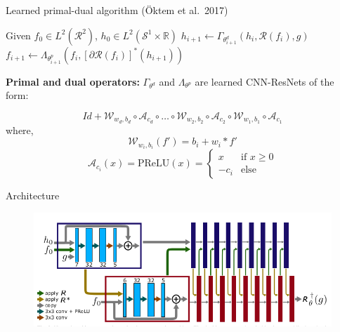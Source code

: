 \begin{frame}{Learned primal-dual algorithm (\"Oktem et al.\, 2017)}
\begin{algorithm}[H]
\begin{algorithmic}[1]
\STATE Given $f_0\in L^2(\mathcal{R}^2)$, $h_0\in L^2(\mathcal{S}^1\times \mathbb{R})$
\STATE $h_{i+1}\longleftarrow \Gamma_{\theta_{i+1}^d} (h_i,\mathcal{R}(f_i),g)$
\STATE $f_{i+1}\longleftarrow \Lambda_{\theta_{i+1}^p} (f_i,[\partial\mathcal{R}(f_i)]^*(h_{i+1}))$
\ENDFOR
\end{algorithmic}
\caption{Learned primal-dual algorithm}
\label{alg:seq}
\end{algorithm}

\pause

\textbf{Primal and dual operators:} $\Gamma_{\theta^d}$ and $\Lambda_{\theta^p}$ are learned CNN-ResNets of the form:

$$
Id+\mathcal{W}_{w_d,b_d}\circ \mathcal{A}_{c_d}\circ\ldots\circ\mathcal{W}_{w_2,b_2}\circ\mathcal{A}_{c_2}\circ\mathcal{W}_{w_1,b_1}\circ\mathcal{A}_{c_1}
$$
where,
$$
\mathcal{W}_{w_i,b_i}(f')=b_i+w_i\ast f'
$$
$$
\mathcal{A}_{c_i}(x)=\text{PReLU}(x) = \begin{cases} x & \text{if $x\geq 0$} \\ -c_i & \text{else} \end{cases}
$$
\end{frame}

\begin{frame}{Architecture}
\begin{figure}[!tbp]
  \centering
    \includegraphics[width=\textwidth]{Images/architecture.png}
\end{figure}
\end{frame}

